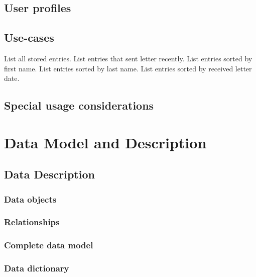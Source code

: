 \documentclass{article}
\begin{document}
\subsection{User profiles}


\subsection{Use-cases}
List all stored entries.
List entries that sent letter recently.
List entries sorted by first name.
List entries sorted by last name.
List entries sorted by received letter date.


\subsection{Special usage considerations}

\section{Data Model and Description}

\subsection{Data Description}

\subsubsection{Data objects}

\subsubsection{Relationships}

\subsubsection{Complete data model}

\subsubsection{Data dictionary}
\end{document}
